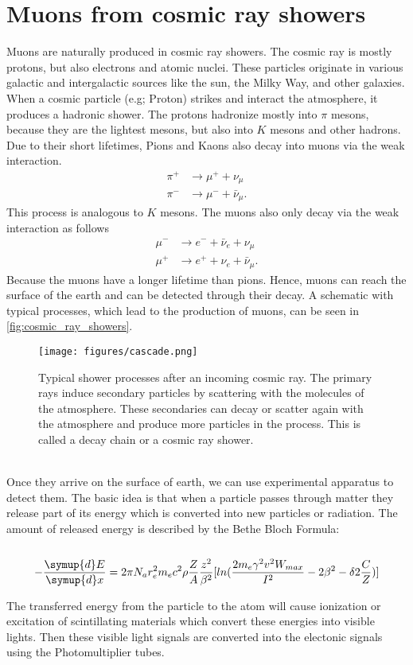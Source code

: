 \section{Muons from cosmic ray showers} 
Muons are naturally produced in cosmic ray showers.
The cosmic ray is mostly protons, but also electrons and atomic nuclei.
These particles originate in various galactic and intergalactic sources like the sun, the Milky Way, and other galaxies.
When a cosmic particle (e.g; Proton) strikes and interact the atmosphere, it produces a hadronic shower.
The protons hadronize mostly into $\pi$ mesons, because they are the lightest mesons, but also into $K$ mesons and other hadrons.
Due to their short lifetimes, Pions and Kaons also decay into muons via the weak interaction. 
\begin{align*}
    \pi^{+} &\to \mu^{+} + \nu_{\mu} \\
    \pi^{-} &\to \mu^{-} + \bar{\nu}_{\mu}.
\end{align*}
This process is analogous to $K$ mesons.
The muons also only decay via the weak interaction as follows 
\begin{align*}
    \mu^{-} &\to e^{-} + \bar{\nu}_{e} + {\nu}_{\mu} \\
    \mu^{+} &\to e^{+} + \nu_{e} + \bar{\nu}_{\mu}.
\end{align*}
Because the muons have a longer lifetime than pions. Hence, muons can reach the surface of the earth and can be detected through their decay. 
A schematic with typical processes, which lead to the production of muons, can be seen in \autoref{fig:cosmic_ray_showers}.
\begin{figure}
    \centering
    \texttt{[image: figures/cascade.png]}
    \caption{Typical shower processes after an incoming cosmic ray. The primary rays induce secondary particles by scattering with the 
    molecules of the atmosphere. These secondaries can decay or scatter again with the atmosphere and produce more particles in the process. 
    This is called a decay chain or a cosmic ray shower\cite{nasa}.}
    \label{fig:cosmic_ray_showers}
\end{figure}
\\
Once they arrive on the surface of earth, we can use experimental apparatus to detect them.
The basic idea is that when a particle passes through matter they release part of its energy which is converted into new particles or radiation.
The amount of released energy is described by the Bethe Bloch Formula:\\\\
\begin{equation*}
-\frac {\symup{d}E}{\symup{d}x} = 2 \pi N_a r_{e}^{2}m_{e}c^{2}\rho \frac{Z}{A} \frac {z^{2}}{\beta^{2}} [ ln(\frac{2m_{e} \gamma^{2} v^{2} W_{max}}{I^{2}}  - 2 \beta^{2} - \delta 2 \frac {C}{Z})]
\end{equation*}

The transferred energy from the particle to the atom will cause ionization or excitation of scintillating materials which convert these energies into visible lights. Then these visible light signals are converted into the electonic signals using the Photomultiplier tubes.

